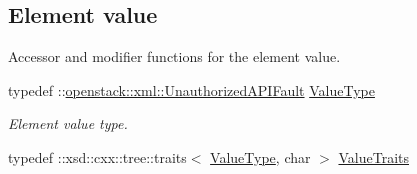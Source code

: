 \subsection*{Element value}
\label{_amgrp2ee2eae1a8c390ea033f241c027da8d6}
Accessor and modifier functions for the element value. \begin{DoxyCompactItemize}
\item 
\hypertarget{classopenstack_1_1xml_1_1Unauthorized_ae0f1ffe9209a29fc0a7b480bf3ce5313}{
typedef ::\hyperlink{classopenstack_1_1xml_1_1UnauthorizedAPIFault}{openstack::xml::UnauthorizedAPIFault} \hyperlink{classopenstack_1_1xml_1_1Unauthorized_ae0f1ffe9209a29fc0a7b480bf3ce5313}{ValueType}}
\label{classopenstack_1_1xml_1_1Unauthorized_ae0f1ffe9209a29fc0a7b480bf3ce5313}

\begin{DoxyCompactList}\small\item\em Element value type. \item\end{DoxyCompactList}\item 
\hypertarget{classopenstack_1_1xml_1_1Unauthorized_aff58adf1c1b3fc346ed6e4f8f7e81fc9}{
typedef ::xsd::cxx::tree::traits$<$ \hyperlink{classopenstack_1_1xml_1_1UnauthorizedAPIFault}{ValueType}, char $>$ \hyperlink{classopenstack_1_1xml_1_1Unauthorized_aff58adf1c1b3fc346ed6e4f8f7e81fc9}{ValueTraits}}
\label{classopenstack_1_1xml_1_1Unauthorized_aff58adf1c1b3fc346ed6e4f8f7e81fc9}


\end{DoxyCompactItemize}
